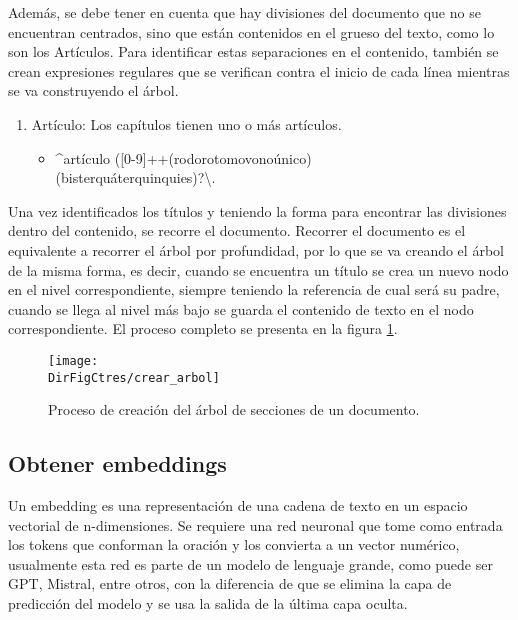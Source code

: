 Además, se debe tener en cuenta que hay divisiones del documento
que no se encuentran centrados, sino que están contenidos en el grueso del
texto, como lo son los Artículos. Para identificar estas separaciones en el
contenido, también se crean expresiones regulares que se verifican contra el
inicio de cada línea mientras se va construyendo el árbol.

\begin{enumerate}
    \item Artículo: Los capítulos tienen uno o más artículos.
          \begin{itemize}
              \item  \string^artículo ([0-9]+\textbar[a-zé]+(ro\textbar do\textbar ro\textbar to\textbar mo\textbar vo\textbar no\textbar único)\\
                    (bis\textbar ter\textbar quáter\textbar quinquies)?\textbackslash.
          \end{itemize}
\end{enumerate}

Una vez identificados los títulos y teniendo la forma para encontrar las
divisiones dentro del contenido, se recorre el documento. Recorrer
el documento es el equivalente a recorrer el árbol por profundidad, por lo
que se va creando el árbol de la misma forma, es decir, cuando se encuentra
un título se crea un nuevo nodo en el nivel correspondiente, siempre teniendo
la referencia de cual será su padre, cuando se llega al nivel más bajo se
guarda el contenido de texto en el nodo correspondiente.
El proceso completo se presenta en la figura
\ref{fig:crear_arbol}.

\begin{figure}[]
    \centering
    \texttt{[image: \\DirFigCtres/crear\_arbol]}
    \caption{Proceso de creación del árbol de secciones de un documento.}
    \label{fig:crear_arbol}
\end{figure}

\subsection{Obtener embeddings}

Un embedding es una representación de una cadena de texto en un espacio
vectorial de n-dimensiones. Se requiere una red neuronal que tome como entrada
los tokens que conforman la oración y los convierta a un vector numérico,
usualmente esta red es parte de un modelo de lenguaje grande, como puede ser
GPT, Mistral, entre otros, con la diferencia de que se elimina la capa de
predicción del modelo y se usa la salida de la última capa oculta.

